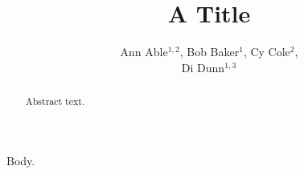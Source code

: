 \title{A Title}
\author{%
Ann Able$^{1,2}$,
\quad Bob Baker$^{1}$,
\quad Cy Cole$^{2}$,\\
\quad Di Dunn$^{1,3}$
}
\maketitle
\address{%
$^1$ Univ A, Town, Country\\
$^2$ Univ B, City, Country\\
$^3$ Lab C, Place, Country
}
\begin{abstract}
Abstract text.
\end{abstract}
Body.


